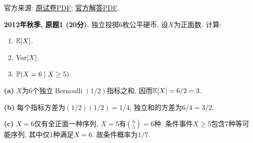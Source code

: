 \noindent 官方来源: \href{https://ocw.mit.edu/courses/18-600-probability-and-random-variables-fall-2019/ae6f4359ccee9674fadd34ea6fd23c09_MIT18_600F19_mid1_2012.pdf}{原试卷PDF}; \href{https://ocw.mit.edu/courses/18-600-probability-and-random-variables-fall-2019/d13729835fe69d90045baff75c4ba80c_MIT18_600F19_mid1_2012_soln.pdf}{官方解答PDF}.
\begin{exercise}\label{ex:m1-2012f-q1}
\textbf{2012年秋季, 原题1 (20分).} 独立投掷6枚公平硬币, 设$X$为正面数. 计算:
\begin{enumerate}\item[(a)]\label{ex:m1-2012f-q1-a} $\mathbb E[X]$.\item[(b)]\label{ex:m1-2012f-q1-b} $\operatorname{Var}[X]$.\item[(c)]\label{ex:m1-2012f-q1-c} $\mathbb P(X=6\mid X\ge5)$.\end{enumerate}
\end{exercise}
\begin{solution}
\textbf{(a)}\label{sol:m1-2012f-q1-a} $X$为6个独立$\operatorname{Bernoulli}(1/2)$指标之和, 因而$\mathbb E[X]=6/2=3$.

\textbf{(b)}\label{sol:m1-2012f-q1-b} 每个指标方差为$(1/2)(1/2)=1/4$, 独立和的方差为$6/4=3/2$.

\textbf{(c)}\label{sol:m1-2012f-q1-c} $X=6$仅有全正面一种序列, $X=5$有$\binom65=6$种. 条件事件$X\ge5$包含7种等可能序列, 其中仅1种满足$X=6$. 故条件概率为$1/7$.
\end{solution}

